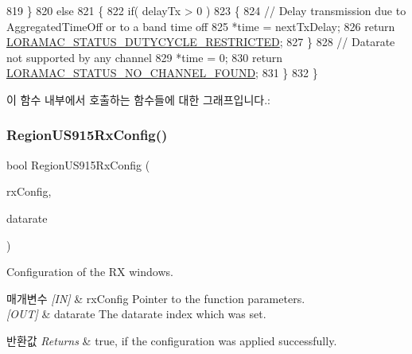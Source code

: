 \begin{DoxyCode}
819     \}
820     \textcolor{keywordflow}{else}
821     \{
822         \textcolor{keywordflow}{if}( delayTx > 0 )
823         \{
824             \textcolor{comment}{// Delay transmission due to AggregatedTimeOff or to a band time off}
825             *time = nextTxDelay;
826             \textcolor{keywordflow}{return} \mbox{\hyperlink{group___l_o_r_a_m_a_c_gga1d18f26b344040b3ec5c3db662919661a0c982ada0769ecee2e1041fb6945ddd4}{LORAMAC\_STATUS\_DUTYCYCLE\_RESTRICTED}};
827         \}
828         \textcolor{comment}{// Datarate not supported by any channel}
829         *time = 0;
830         \textcolor{keywordflow}{return} \mbox{\hyperlink{group___l_o_r_a_m_a_c_gga1d18f26b344040b3ec5c3db662919661a393266a9952cf6617917f1fce181efcd}{LORAMAC\_STATUS\_NO\_CHANNEL\_FOUND}};
831     \}
832 \}
\end{DoxyCode}
이 함수 내부에서 호출하는 함수들에 대한 그래프입니다.\+:
\mbox{\label{group___r_e_g_i_o_n_u_s915_ga714ceef0507bb8bd0a65c5b2de8eff2c}} 
\subsubsection{\texorpdfstring{Region\+U\+S915\+Rx\+Config()}{RegionUS915RxConfig()}}
{\footnotesize\ttfamily bool Region\+U\+S915\+Rx\+Config (\begin{DoxyParamCaption}\item[{\mbox{\hyperlink{group___r_e_g_i_o_n_ga375c038078dfcfc7ef14280021db719e}{Rx\+Config\+Params\+\_\+t}} $\ast$}]{rx\+Config,  }\item[{int8\+\_\+t $\ast$}]{datarate }\end{DoxyParamCaption})}



Configuration of the RX windows. 


\begin{DoxyParams}{매개변수}
{\em \mbox{[}\+I\+N\mbox{]}} & rx\+Config Pointer to the function parameters.\\
\hline
{\em \mbox{[}\+O\+U\+T\mbox{]}} & datarate The datarate index which was set.\\
\hline
\end{DoxyParams}

\begin{DoxyRetVals}{반환값}
{\em Returns} & true, if the configuration was applied successfully. \\
\hline
\end{DoxyRetVals}


